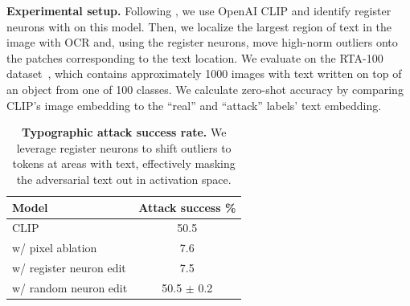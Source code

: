 \documentclass{article}
\begin{document}
\textbf{Experimental setup.} Following \cite{azuma2023defense}, we use OpenAI CLIP \citep{radford2021learning} and identify register neurons with  on this model. Then, we localize the largest region of text in the image with OCR and, using the register neurons, move high-norm outliers onto the patches corresponding to the text location. We evaluate on the RTA-100 dataset~\citep{azuma2023defense}, which contains approximately 1000 images with text written on top of an object from one of 100 classes. We calculate zero-shot accuracy by comparing CLIP's image embedding to the ``real'' and ``attack'' labels' text embedding.
\begin{table}
  \centering
  \vspace{0.5cm}
  \begin{tabular}{l|c}
    \toprule
    Model & Attack success \% \\
    \midrule
    CLIP & 50.5 \\
    w/ pixel ablation & 7.6 \\
    w/ register neuron edit & 7.5 \\
    w/ random neuron edit & 50.5 $\pm$ 0.2 \\
    \bottomrule
  \end{tabular}
  \caption{
    \textbf{Typographic attack success rate.} We leverage register neurons to shift outliers to tokens at areas with text, effectively masking the adversarial text out in activation space.
  }\vspace{-0.5cm}
  \label{tab:typographic_quantitative}
\end{table}
\end{document}
